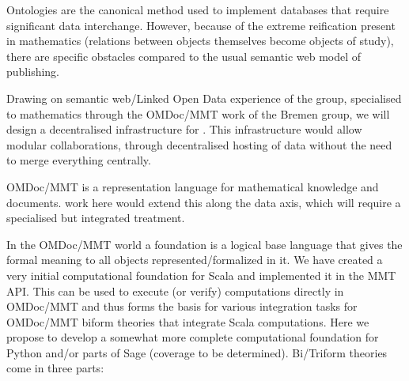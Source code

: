 \begin{workpackage}[id=dksbases,%
  title=Dks/Knowledge/Software-Bases,lead=JU,
  ZHRM=12,JURM=36,USHRM=12,UWRM=25,SARM=10,LLRM=2,PSRM=4]
\begin{tasklist}
\begin{task}[id=data-design,lead=JU,partners={ZH,US,SA,UW,LL},wphases=5-8,PM=2,
  title={and design of new  infrastructure when appropriate}]

  Ontologies are the canonical method used to implement databases that require significant
  data interchange. However, because of the extreme reification present in mathematics
  (relations between objects themselves become objects of study), there are specific
  obstacles compared to the usual semantic web model of publishing.

  Drawing on semantic web/Linked Open Data experience of the  group, specialised to
  mathematics through the OMDoc/MMT work of the Bremen group, we will design a
  decentralised infrastructure for \TheProject. This infrastructure would allow modular
  collaborations, through decentralised hosting of data without the need to merge
  everything centrally.

\end{task}

\begin{task}[title=Triform Theories in OMDoc/MMT,id=data-triform,
  lead=JU,partners={ZH},PM=6,wphases=6-12]
  OMDoc/MMT is a representation language for mathematical knowledge and documents. work here would extend this along the data axis, which
  will require a specialised but integrated treatment.
\end{task}

\begin{task}[title=Computational Foundation for Python/Sage (or some CAS),
  id=data-foundationCAS,lead=JU,partners={ZH,SA},PM=6,wphases=12-18]

In the OMDoc/MMT world a foundation is a logical base language that
gives the formal meaning to all objects represented/formalized in
it. We have created a very initial computational foundation for Scala
and implemented it in the MMT API. This can be used to execute (or
verify) computations directly in OMDoc/MMT and thus forms the basis
for various integration tasks for OMDoc/MMT biform theories that
integrate Scala computations. Here we propose to develop a somewhat
more complete computational foundation for Python and/or parts of Sage
(coverage to be determined). Bi/Triform theories come in three parts:
\begin{compactitem}


\end{compactitem}
\end{task}
\end{tasklist}
\end{workpackage}
